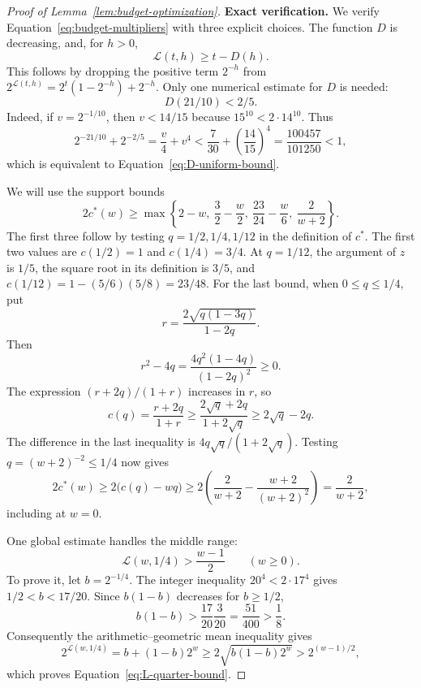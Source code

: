 \begin{proof}[Proof of Lemma~\ref{lem:budget-optimization}]
\medskip\noindent\textbf{Exact verification.}
We verify Equation~\eqref{eq:budget-multipliers} with three explicit
choices. The function \(D\) is decreasing, and, for \(h>0\),
\begin{equation}\label{eq:L-linear-bound}
 \mathcal L(t,h)\ge t-D(h).
\end{equation}
This follows by dropping the positive term \(2^{-h}\) from
\(2^{\mathcal L(t,h)}=2^t(1-2^{-h})+2^{-h}\).
Only one numerical estimate for \(D\) is needed:
\begin{equation}\label{eq:D-uniform-bound}
 D(21/10)<2/5.
\end{equation}
Indeed, if \(v=2^{-1/10}\), then \(v<14/15\) because
\(15^{10}<2\cdot14^{10}\). Thus
\[
 2^{-21/10}+2^{-2/5}
 =\frac v4+v^4
 <\frac7{30}+\left(\frac{14}{15}\right)^4
 =\frac{100457}{101250}<1,
\]
which is equivalent to Equation~\eqref{eq:D-uniform-bound}.

We will use the support bounds
\begin{equation}\label{eq:dual-support-lines}
 2c^*(w)\ge
 \max\left\{2-w,\ \frac32-\frac w2,\
             \frac{23}{24}-\frac w6,\ \frac2{w+2}\right\}.
\end{equation}
The first three follow by testing \(q=1/2,1/4,1/12\) in the
definition of \(c^*\). The first two values are \(c(1/2)=1\) and
\(c(1/4)=3/4\). At \(q=1/12\), the argument of \(z\) is \(1/5\),
the square root in its definition is \(3/5\), and
\(c(1/12)=1-(5/6)(5/8)=23/48\).
For the last bound, when \(0\le q\le1/4\), put
\[
 r=\frac{2\sqrt{q(1-3q)}}{1-2q}.
\]
Then
\[
 r^2-4q=\frac{4q^2(1-4q)}{(1-2q)^2}\ge0.
\]
The expression \((r+2q)/(1+r)\) increases in \(r\), so
\[
 c(q)=\frac{r+2q}{1+r}
 \ge\frac{2\sqrt q+2q}{1+2\sqrt q}
 \ge2\sqrt q-2q.
\]
The difference in the last inequality is
\(4q\sqrt q/(1+2\sqrt q)\). Testing
\(q=(w+2)^{-2}\le1/4\) now gives
\[
 2c^*(w)\ge2\bigl(c(q)-wq\bigr)
 \ge2\left(\frac2{w+2}-\frac{w+2}{(w+2)^2}\right)
 =\frac2{w+2},
\]
including at \(w=0\).

One global estimate handles the middle range:
\begin{equation}\label{eq:L-quarter-bound}
 \mathcal L(w,1/4)>\frac{w-1}{2}\qquad(w\ge0).
\end{equation}
To prove it, let \(b=2^{-1/4}\). The integer inequality
\(20^4<2\cdot17^4\) gives \(1/2<b<17/20\). Since
\(b(1-b)\) decreases for \(b\ge1/2\),
\[
 b(1-b)>\frac{17}{20}\frac3{20}
 =\frac{51}{400}>\frac18.
\]
Consequently the arithmetic--geometric mean inequality gives
\[
 2^{\mathcal L(w,1/4)}=b+(1-b)2^w
 \ge2\sqrt{b(1-b)2^w}>2^{(w-1)/2},
\]
which proves Equation~\eqref{eq:L-quarter-bound}.


\end{proof}
